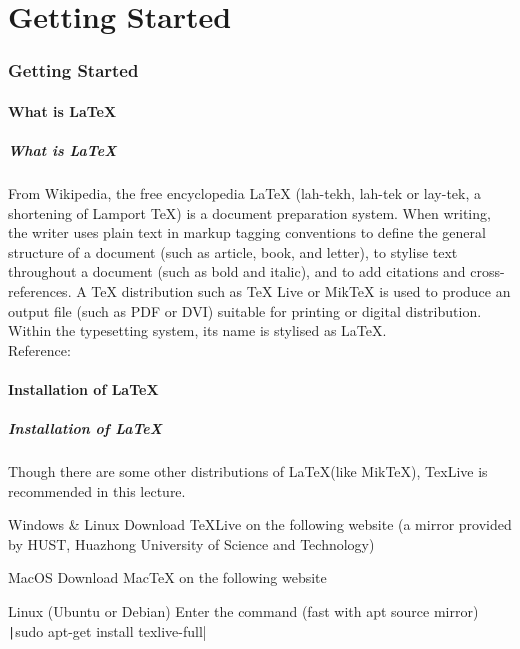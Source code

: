 \part{Getting Started}

\section{Getting Started}
\begin{frame}
\end{frame}

\subsection{What is \LaTeX}

\begin{frame}
	\frametitle{What is \LaTeX}
	\begin{block}{From Wikipedia, the free encyclopedia}
		LaTeX (lah-tekh, lah-tek or lay-tek, a shortening of Lamport TeX) is a document preparation system. When writing, the writer uses plain text in markup tagging conventions to define the general structure of a document (such as article, book, and letter), to stylise text throughout a document (such as bold and italic), and to add citations and cross-references. A TeX distribution such as TeX Live or MikTeX is used to produce an output file (such as PDF or DVI) suitable for printing or digital distribution. Within the typesetting system, its name is stylised as \LaTeX.	\\[0.5em]
	Reference: 
	\end{block}

\end{frame}

\subsection{Installation of \LaTeX}
\begin{frame}
	\frametitle{Installation of \LaTeX}
	Though there are some other distributions of \LaTeX (like MikTeX), TexLive is recommended in this lecture.
	\begin{block}{Windows \& Linux}
		Download TeXLive on the following website (a mirror provided by HUST, Huazhong University of Science and Technology) \\
	\end{block}
	\begin{block}{MacOS}
		Download MacTeX on the following website\\
	\end{block}
	\begin{block}{Linux (Ubuntu or Debian)}
		Enter the command (fast with apt source mirror) \\
		\texttt|sudo apt-get install texlive-full|
	\end{block}
\end{frame}

